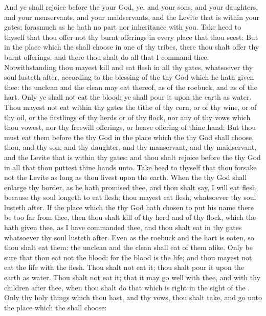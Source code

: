 \begin{biblechapter}
\verse And ye shall rejoice before the \LORD your God, ye, and your sons, and your daughters, and your menservants, and your maidservants, and the Levite that is within your gates; forasmuch as he hath no part nor inheritance with you.
\verse Take heed to thyself that thou offer not thy burnt offerings in every place that thou seest:
\verse But in the place which the \LORD shall choose in one of thy tribes, there thou shalt offer thy burnt offerings, and there thou shalt do all that I command thee.
\verse Notwithstanding thou mayest kill and eat flesh in all thy gates, whatsoever thy soul lusteth after, according to the blessing of the \LORD thy God which he hath given thee: the unclean and the clean may eat thereof, as of the roebuck, and as of the hart.
\verse Only ye shall not eat the blood; ye shall pour it upon the earth as water.
\verse Thou mayest not eat within thy gates the tithe of thy corn, or of thy wine, or of thy oil, or the firstlings of thy herds or of thy flock, nor any of thy vows which thou vowest, nor thy freewill offerings, or heave offering of thine hand:
\verse But thou must eat them before the \LORD thy God in the place which the \LORD thy God shall choose, thou, and thy son, and thy daughter, and thy manservant, and thy maidservant, and the Levite that is within thy gates: and thou shalt rejoice before the \LORD thy God in all that thou puttest thine hands unto.
\verse Take heed to thyself that thou forsake not the Levite as long as thou livest upon the earth.
\verse When the \LORD thy God shall enlarge thy border, as he hath promised thee, and thou shalt say, I will eat flesh, because thy soul longeth to eat flesh; thou mayest eat flesh, whatsoever thy soul lusteth after.
\verse If the place which the \LORD thy God hath chosen to put his name there be too far from thee, then thou shalt kill of thy herd and of thy flock, which the \LORD hath given thee, as I have commanded thee, and thou shalt eat in thy gates whatsoever thy soul lusteth after.
\verse Even as the roebuck and the hart is eaten, so thou shalt eat them: the unclean and the clean shall eat of them alike.
\verse Only be sure that thou eat not the blood: for the blood is the life; and thou mayest not eat the life with the flesh.
\verse Thou shalt not eat it; thou shalt pour it upon the earth as water.
\verse Thou shalt not eat it; that it may go well with thee, and with thy children after thee, when thou shalt do that which is right in the sight of the \LORD.
\verse Only thy holy things which thou hast, and thy vows, thou shalt take, and go unto the place which the \LORD shall choose:

\end{biblechapter}
